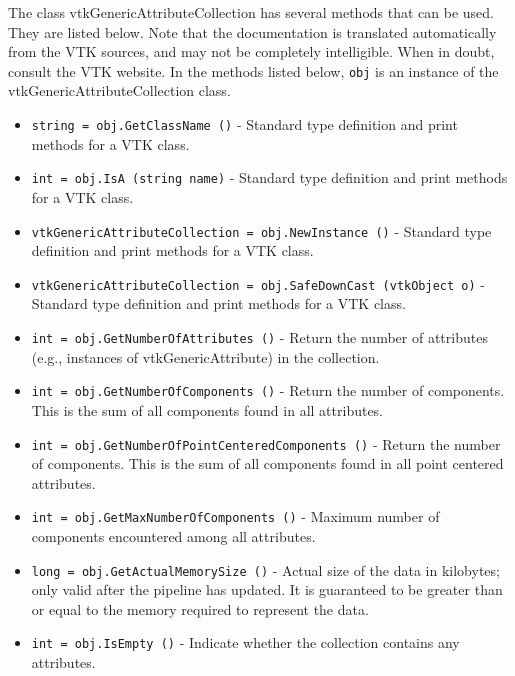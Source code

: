 The class vtkGenericAttributeCollection has several methods that can be used.
  They are listed below.
Note that the documentation is translated automatically from the VTK sources,
and may not be completely intelligible.  When in doubt, consult the VTK website.
In the methods listed below, \verb|obj| is an instance of the vtkGenericAttributeCollection class.
\begin{itemize}
\item  \verb|string = obj.GetClassName ()| -  Standard type definition and print methods for a VTK class.

\item  \verb|int = obj.IsA (string name)| -  Standard type definition and print methods for a VTK class.

\item  \verb|vtkGenericAttributeCollection = obj.NewInstance ()| -  Standard type definition and print methods for a VTK class.

\item  \verb|vtkGenericAttributeCollection = obj.SafeDownCast (vtkObject o)| -  Standard type definition and print methods for a VTK class.

\item  \verb|int = obj.GetNumberOfAttributes ()| -  Return the number of attributes (e.g., instances of vtkGenericAttribute) 
 in the collection.
 

\item  \verb|int = obj.GetNumberOfComponents ()| -  Return the number of components. This is the sum of all components
 found in all attributes.
 

\item  \verb|int = obj.GetNumberOfPointCenteredComponents ()| -  Return the number of components. This is the sum of all components
 found in all point centered attributes.
 

\item  \verb|int = obj.GetMaxNumberOfComponents ()| -  Maximum number of components encountered among all attributes.
 
 

\item  \verb|long = obj.GetActualMemorySize ()| -  Actual size of the data in kilobytes; only valid after the pipeline has
 updated. It is guaranteed to be greater than or equal to the memory
 required to represent the data.

\item  \verb|int = obj.IsEmpty ()| -  Indicate whether the collection contains any attributes.
 


\end{itemize}
